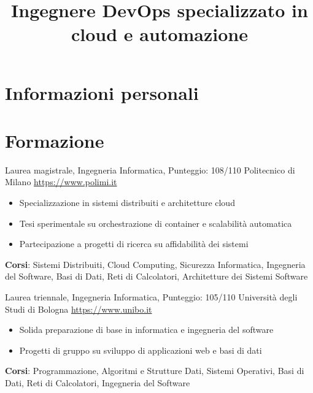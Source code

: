 \documentclass[a4paper, serif, 10pt]{moderncv}
\title{Ingegnere DevOps specializzato in cloud e automazione}
\begin{document}
\maketitle

\section{Informazioni personali}

\section{Formazione}

        {Laurea magistrale, Ingegneria Informatica, Punteggio: 108/110}
        {Politecnico di Milano}
        {\url{https://www.polimi.it}}
        {}
        {\begin{itemize}
\item Specializzazione in sistemi distribuiti e architetture cloud
\item Tesi sperimentale su orchestrazione di container e scalabilità automatica
\item Partecipazione a progetti di ricerca su affidabilità dei sistemi
\end{itemize}
\textbf{Corsi}: Sistemi Distribuiti, Cloud Computing, Sicurezza Informatica, Ingegneria del Software, Basi di Dati, Reti di Calcolatori, Architetture dei Sistemi Software}

        {Laurea triennale, Ingegneria Informatica, Punteggio: 105/110}
        {Università degli Studi di Bologna}
        {\url{https://www.unibo.it}}
        {}
        {\begin{itemize}
\item Solida preparazione di base in informatica e ingegneria del software
\item Progetti di gruppo su sviluppo di applicazioni web e basi di dati
\end{itemize}
\textbf{Corsi}: Programmazione, Algoritmi e Strutture Dati, Sistemi Operativi, Basi di Dati, Reti di Calcolatori, Ingegneria del Software}
\end{document}
